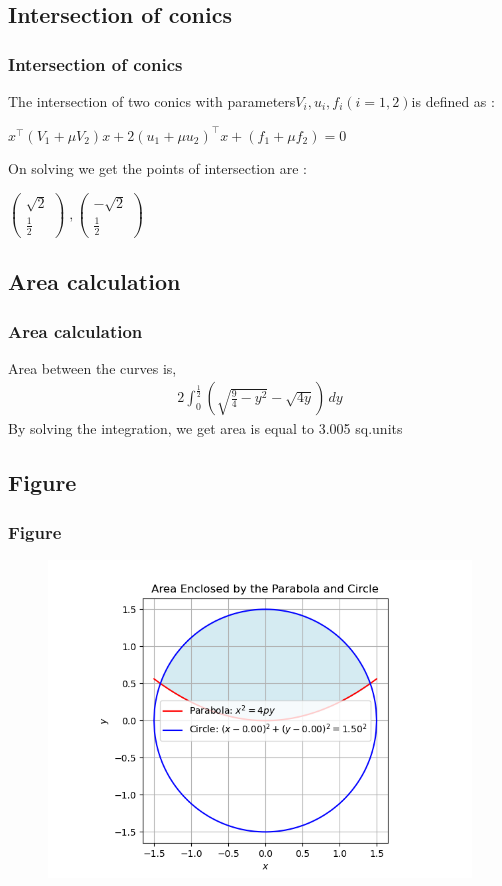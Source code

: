 \documentclass{beamer}
\providecommand{\brak}[1]{\ensuremath{\left(#1\right)}}
\theoremstyle{remark}
\newcommand{\myvec}[1]{\ensuremath{\begin{pmatrix}#1\end{pmatrix}}}
\numberwithin{equation}{section}
\begin{document}
\subsection{Intersection of conics}
\begin{frame}
\frametitle{Intersection of conics}
The intersection of two conics with parameters$ V_i, u_i, f_i (i = 1, 2) $is defined as :
\begin{center}
    $x^\top (V_1 + \mu V_2) x + 2(u_1 + \mu u_2)^\top x + (f_1 + \mu f_2) = 0$
\end{center}

On solving we get the points of intersection are :
\begin{center}
    $\myvec{\sqrt{2}\\\frac{1}{2}}\;,\myvec{-\sqrt{2}\\\frac{1}{2}}$
\end{center}

\end{frame}
\subsection{Area calculation}
\begin{frame}
\frametitle{Area calculation}
Area between the curves is,
\begin{align}
2\int_{0}^{\frac{1}{2}} \brak{\sqrt{\frac{9}{4}-y^2}-\sqrt{4y}} \, dy 
\end{align}
By solving the integration, we get area is equal to 3.005 sq.units
\end{frame}

\subsection{Figure}
\begin{frame}
\frametitle{Figure}

\begin{figure}
   \centering
   \includegraphics[width=\linewidth]{figs/fig2.png}
   \label{stemplot}
   \caption{}
\end{figure}
\end{frame}
\end{document}
